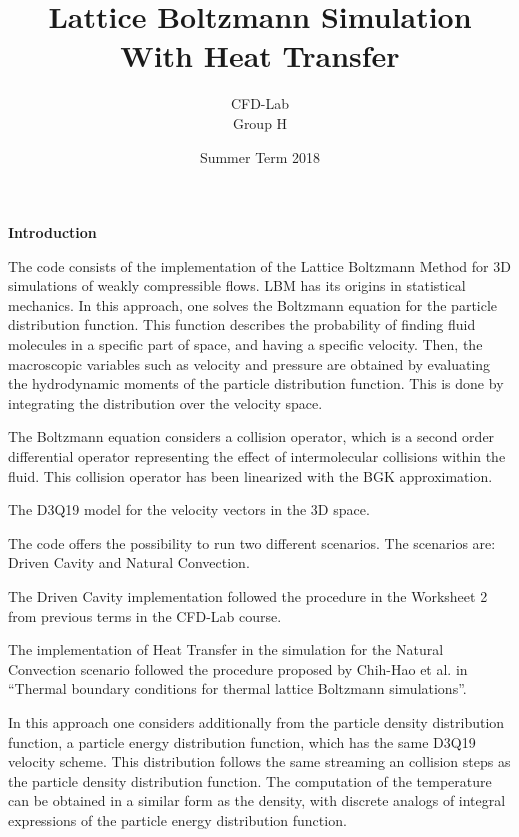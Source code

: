 \documentclass[]{article}
\begin{document}
\title{Lattice Boltzmann Simulation With Heat Transfer}

\author{CFD-Lab\\Group H} \date{Summer Term 2018}

\maketitle

\textbf{Introduction}

The code consists of the implementation of the Lattice Boltzmann Method
for 3D simulations of weakly compressible flows. LBM has its origins in
statistical mechanics. In this approach, one solves the Boltzmann
equation for the particle distribution function. This function describes
the probability of finding fluid molecules in a specific part of space,
and having a specific velocity. Then, the macroscopic variables such as
velocity and pressure are obtained by evaluating the hydrodynamic
moments of the particle distribution function. This is done by
integrating the distribution over the velocity space.

The Boltzmann equation considers a collision operator, which is a second
order differential operator representing the effect of intermolecular
collisions within the fluid. This collision operator has been linearized
with the BGK approximation.

The D3Q19 model for the velocity vectors in the 3D space.

The code offers the possibility to run two different scenarios. The
scenarios are: Driven Cavity and Natural Convection.

The Driven Cavity implementation followed the procedure in the Worksheet
2 from previous terms in the CFD-Lab course.

The implementation of Heat Transfer in the simulation for the Natural
Convection scenario followed the procedure proposed by Chih-Hao et al.
in ``Thermal boundary conditions for thermal lattice Boltzmann
simulations''.

In this approach one considers additionally from the particle density
distribution function, a particle energy distribution function, which
has the same D3Q19 velocity scheme. This distribution follows the same
streaming an collision steps as the particle density distribution
function. The computation of the temperature can be obtained in a
similar form as the density, with discrete analogs of integral
expressions of the particle energy distribution function.
\end{document}
